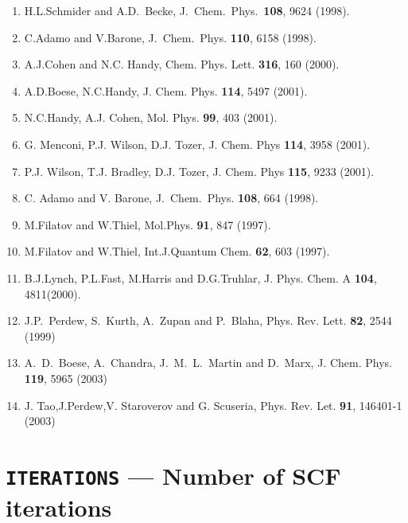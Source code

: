 {\begin{enumerate}
\item  H.L.Schmider and A.D.~Becke, J.~Chem.~Phys.~{\bf 108},
9624 (1998). \\
\item C.Adamo and V.Barone, J.~Chem.~Phys. {\bf 110}, 6158 (1998).\\
\item  A.J.Cohen and N.C. Handy, Chem. Phys. Lett. {\bf 316}, 160 (2000).\\
\item  A.D.Boese,  N.C.Handy, J. Chem. Phys. {\bf 114}, 5497
(2001). \\
\item  N.C.Handy, A.J. Cohen, Mol. Phys. {\bf 99}, 403 (2001).\\
\item G. Menconi, P.J. Wilson, D.J. Tozer, 
J. Chem. Phys {\bf 114}, 3958 (2001).\\
\item  P.J. Wilson, T.J. Bradley, D.J. Tozer, J. Chem. Phys {\bf 115}, 
9233 (2001).\\
\item C. Adamo and V. Barone, J.~Chem.~Phys. {\bf 108}, 664 (1998).\\
\item M.Filatov and W.Thiel, Mol.Phys. {\bf 91}, 847 (1997).\\
\item M.Filatov and W.Thiel, Int.J.Quantum Chem. {\bf 62}, 603 (1997).\\
\item B.J.Lynch, P.L.Fast, M.Harris and D.G.Truhlar, J. Phys. Chem. A
{\bf 104}, 4811(2000).\\
\item  J.P.~Perdew, S.~Kurth, A.~Zupan and P.~Blaha, 
Phys. Rev. Lett. {\bf 82}, 2544 (1999) \\
\item A.~D.~Boese, A.~Chandra, J.~M.~L.~Martin and D.~Marx,
  J. Chem. Phys. {\bf 119}, 5965 (2003) \\
\item J. Tao,J.Perdew,V. Staroverov and G. Scuseria,
Phys. Rev. Let. {\bf 91}, 146401-1 (2003)
\end{enumerate}
}
\onecolumn

\section{{\tt ITERATIONS} --- Number of SCF iterations}

